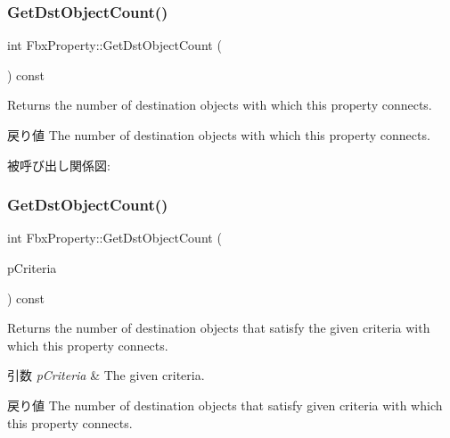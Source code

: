 \subsubsection{\texorpdfstring{Get\+Dst\+Object\+Count()}{GetDstObjectCount()}\hspace{0.1cm}{\footnotesize\ttfamily [1/4]}}
{\footnotesize\ttfamily int Fbx\+Property\+::\+Get\+Dst\+Object\+Count (\begin{DoxyParamCaption}{ }\end{DoxyParamCaption}) const}

Returns the number of destination objects with which this property connects. \begin{DoxyReturn}{戻り値}
The number of destination objects with which this property connects. 
\end{DoxyReturn}
被呼び出し関係図\+:
\mbox{\label{class_fbx_property_acfca6ad7f8a1eebfecc838e91b7af100}} 
\subsubsection{\texorpdfstring{Get\+Dst\+Object\+Count()}{GetDstObjectCount()}\hspace{0.1cm}{\footnotesize\ttfamily [2/4]}}
{\footnotesize\ttfamily int Fbx\+Property\+::\+Get\+Dst\+Object\+Count (\begin{DoxyParamCaption}\item[{const \hyperlink{class_fbx_criteria}{Fbx\+Criteria} \&}]{p\+Criteria }\end{DoxyParamCaption}) const}

Returns the number of destination objects that satisfy the given criteria with which this property connects. 
\begin{DoxyParams}{引数}
{\em p\+Criteria} & The given criteria. \\
\hline
\end{DoxyParams}
\begin{DoxyReturn}{戻り値}
The number of destination objects that satisfy given criteria with which this property connects. 
\end{DoxyReturn}
\mbox{\label{class_fbx_property_a99dd8bf0103c66a7a8bf3a5ea72e41bd}} 
